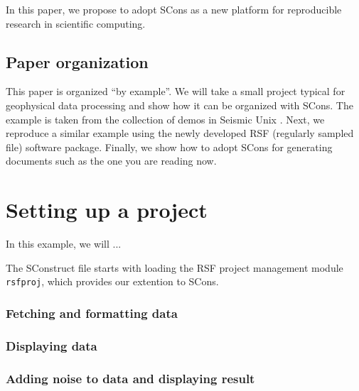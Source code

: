 In this paper, we propose to adopt SCons as a new platform for
reproducible research in scientific computing.

\subsection{Paper organization}

This paper is organized ``by example''. We will take a small project
typical for geophysical data processing and show how it can be
organized with SCons.  The example is taken from the collection of
demos in Seismic Unix \cite[]{su}.  Next, we reproduce a similar
example using the newly developed RSF (regularly sampled file)
software package. Finally, we show how to adopt SCons for generating
documents such as the one you are reading now.

\section{Setting up a project}

In this example, we will ...


The SConstruct file starts with loading the RSF project management
module \texttt{rsfproj}, which provides our extention to SCons.
%


\subsubsection{Fetching and formatting data}
%


\subsubsection{Displaying data}
%


\subsubsection{Adding noise to data and displaying result}
%





